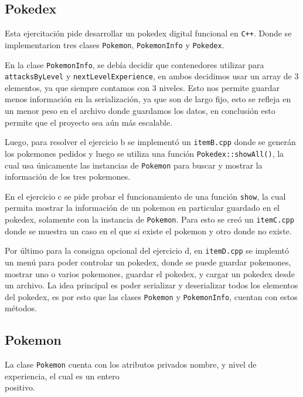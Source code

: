 \documentclass[11pt, a4paper]{article}
\begin{document}
\begin{multicols}{2}

\section{Pokedex}

Esta ejercitación pide desarrollar un pokedex digital funcional en \lstinline|C++|. Donde se implementarion tres clases \lstinline|Pokemon|, \lstinline|PokemonInfo| y \lstinline|Pokedex|.

En la clase \lstinline|PokemonInfo|, se debía decidir que contenedores utilizar para \lstinline|attacksByLevel| y \lstinline|nextLevelExperience|, en ambos decidimos usar un array de 3 elementos, ya que siempre contamos con 3 niveles. Esto nos permite guardar menos información en la serialización, ya que son de largo fijo, esto se refleja en un menor peso en el archivo donde guardamos los datos, en conclusión esto permite que el proyecto sea aún más escalable.

Luego, para resolver el ejercicio b se implementó un \lstinline|itemB.cpp| donde se generán los pokemones pedidos y luego se utiliza una función \lstinline|Pokedex::showAll()|, la cual usa únicamente las instancias de \lstinline|Pokemon| para buscar y mostrar la información de los tres pokemones.

\columnbreak

En el ejercicio c se pide probar el funcionamiento de una función \lstinline|show|, la cual permita mostrar la información de un pokemon en particular guardado en el pokedex, solamente con la instancia de \lstinline|Pokemon|. Para esto se creó un \lstinline|itemC.cpp| donde se muestra un caso en el que si existe el pokemon y otro donde no existe.

Por último para la consigna opcional del ejercicio d, en \lstinline|itemD.cpp| se implemtó un menú para poder controlar un pokedex, donde se puede guardar pokemones, mostrar uno o varios pokemones, guardar el pokedex, y cargar un pokedex desde un archivo. La idea principal es poder serializar y deserializar todos los elementos del pokedex, es por esto que las clases \lstinline|Pokemon| y \lstinline|PokemonInfo|, cuentan con estos métodos.

\columnbreak

\subsection{Pokemon}

La clase \lstinline|Pokemon| cuenta con los atributos privados nombre, y nivel de experiencia, el cual es un entero \\positivo.


\end{multicols}
\end{document}
